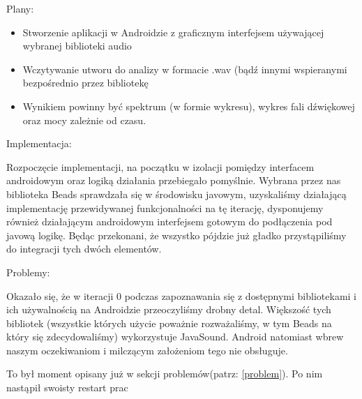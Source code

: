 \begin{Note}
Plany:
\begin{itemize}
    \item Stworzenie aplikacji w Androidzie z graficznym interfejsem używającej wybranej biblioteki audio
    \item Wczytywanie utworu do analizy w formacie .wav (bądź innymi wspieranymi bezpośrednio przez bibliotekę
    \item Wynikiem powinny być spektrum (w formie wykresu), wykres fali dźwiękowej oraz mocy zależnie od czasu.
\end{itemize}

Implementacja:

Rozpoczęcie implementacji, na początku w izolacji pomiędzy interfacem androidowym oraz logiką działania przebiegało pomyślnie. Wybrana przez nas biblioteka Beads sprawdzała się w środowisku javowym, uzyskaliśmy działającą implementację przewidywanej funkcjonalności na tę iterację, dysponujemy również działającym androidowym interfejsem gotowym do podłączenia pod javową logikę. Będąc przekonani, że wszystko pójdzie już gładko przystąpiliśmy do integracji tych dwóch elementów.

Problemy:

Okazało się, że w iteracji 0 podczas zapoznawania się z dostępnymi bibliotekami i ich używalnością na Androidzie przeoczyliśmy drobny detal. Większość tych bibliotek (wszystkie których użycie poważnie rozważaliśmy, w tym Beads na który się zdecydowaliśmy) wykorzystuje JavaSound. Android natomiast wbrew naszym oczekiwaniom i milczącym założeniom tego nie obsługuje.
\end{Note}

To był moment opisany już w sekcji problemów(patrz: \ref{problem}). Po nim nastąpił swoisty restart prac
